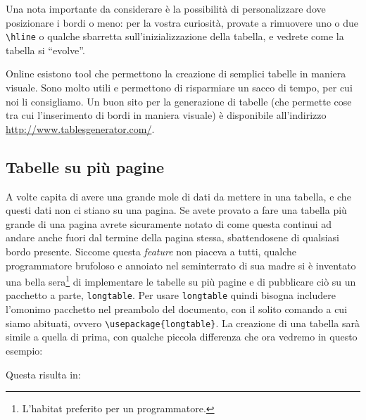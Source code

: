 Una nota importante da considerare è la possibilità di personalizzare dove
posizionare i bordi o meno: per la vostra curiosità, provate a rimuovere uno o
due \verb!\hline! o qualche sbarretta sull'inizializzazione della tabella, e
vedrete come la tabella si ``evolve''.

Online esistono tool che permettono la creazione di semplici tabelle in
maniera visuale. Sono molto utili e permettono di risparmiare un sacco di
tempo, per cui noi li consigliamo. Un buon sito per la generazione di tabelle
(che permette cose tra cui l'inserimento di bordi in maniera visuale) è
disponibile all'indirizzo \url{http://www.tablesgenerator.com/}.

\subsection{Tabelle su più pagine}

A volte capita di avere una grande mole di dati da mettere in una tabella, e
che questi dati non ci stiano su una pagina. Se avete provato a fare una
tabella più grande di una pagina avrete sicuramente notato di come questa
continui ad andare anche fuori dal termine della pagina stessa, sbattendosene
di qualsiasi bordo presente. Siccome questa \textit{feature} non piaceva a
tutti, qualche programmatore brufoloso e annoiato nel seminterrato di sua madre
si è inventato una bella sera\footnote{L'habitat preferito per un
programmatore.} di implementare le tabelle su più pagine e di pubblicare ciò su
un pacchetto a parte, \texttt{longtable}.
Per usare \texttt{longtable} quindi bisogna includere l'omonimo pacchetto nel
preambolo del documento, con il solito comando a cui siamo abituati, ovvero
\verb!\usepackage{longtable}!.
La creazione di una tabella sarà simile a quella di prima, con qualche piccola
differenza che ora vedremo in questo esempio:


Questa risulta in:

